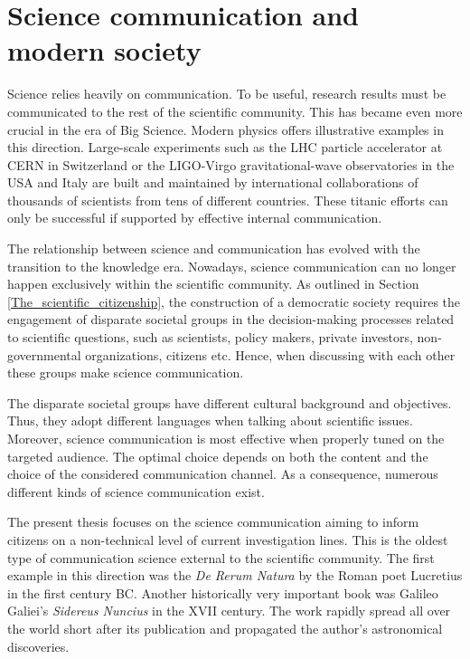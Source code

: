 \section{Science communication and modern society}    
Science relies heavily on communication. To be useful, research results must be communicated to the rest of the scientific community. This has became even more crucial in the era of Big Science. Modern physics offers illustrative examples in this direction. Large-scale experiments such as the LHC particle accelerator at CERN in Switzerland or the LIGO-Virgo gravitational-wave observatories in the USA and Italy are built and maintained by international collaborations of thousands of scientists from tens of different countries. These titanic efforts can only be successful if supported by effective internal communication.  

The relationship between science and communication has evolved with the transition to the knowledge era. Nowadays, science communication can no longer happen exclusively within the scientific community. As outlined in Section \ref{The_scientific_citizenship}, the construction of a democratic society requires the engagement of disparate societal groups in the decision-making processes related to scientific questions, such as scientists, policy makers, private investors, non-governmental organizations, citizens etc. Hence, when discussing with each other these groups make science communication.

The disparate societal groups have different cultural background and objectives. Thus, they adopt different languages when talking about scientific issues. Moreover, science communication is most effective when properly tuned on the targeted audience. The optimal choice depends on both the content and the choice of the considered communication channel. As a consequence, numerous different kinds of science communication exist.   

The present thesis focuses on the science communication aiming to inform citizens on a non-technical level of current investigation lines. This is the oldest type of communication science external to the scientific community. The first example in this direction was the \textit{De Rerum Natura} by the Roman poet Lucretius in the first century BC. Another historically very important book was Galileo Galiei's \textit{Sidereus Nuncius} in the XVII century. The work rapidly spread all over the world short after its publication and propagated the author's astronomical discoveries.

